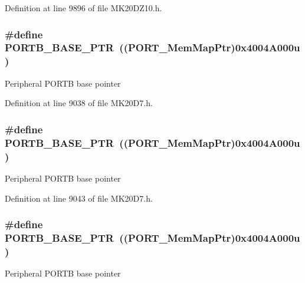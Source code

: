 Definition at line 9896 of file M\+K20\+D\+Z10.\+h.

\subsubsection[{\texorpdfstring{P\+O\+R\+T\+B\+\_\+\+B\+A\+S\+E\+\_\+\+P\+TR}{PORTB_BASE_PTR}}]{\setlength{\rightskip}{0pt plus 5cm}\#define P\+O\+R\+T\+B\+\_\+\+B\+A\+S\+E\+\_\+\+P\+TR~(({\bf P\+O\+R\+T\+\_\+\+Mem\+Map\+Ptr})0x4004\+A000u)}\hypertarget{group___p_o_r_t___peripheral_ga585b4782d1ceb44492289af0019480f9}{}\label{group___p_o_r_t___peripheral_ga585b4782d1ceb44492289af0019480f9}
Peripheral P\+O\+R\+TB base pointer 

Definition at line 9038 of file M\+K20\+D7.\+h.

\subsubsection[{\texorpdfstring{P\+O\+R\+T\+B\+\_\+\+B\+A\+S\+E\+\_\+\+P\+TR}{PORTB_BASE_PTR}}]{\setlength{\rightskip}{0pt plus 5cm}\#define P\+O\+R\+T\+B\+\_\+\+B\+A\+S\+E\+\_\+\+P\+TR~(({\bf P\+O\+R\+T\+\_\+\+Mem\+Map\+Ptr})0x4004\+A000u)}\hypertarget{group___p_o_r_t___peripheral_ga585b4782d1ceb44492289af0019480f9}{}\label{group___p_o_r_t___peripheral_ga585b4782d1ceb44492289af0019480f9}
Peripheral P\+O\+R\+TB base pointer 

Definition at line 9043 of file M\+K20\+D7.\+h.

\subsubsection[{\texorpdfstring{P\+O\+R\+T\+B\+\_\+\+B\+A\+S\+E\+\_\+\+P\+TR}{PORTB_BASE_PTR}}]{\setlength{\rightskip}{0pt plus 5cm}\#define P\+O\+R\+T\+B\+\_\+\+B\+A\+S\+E\+\_\+\+P\+TR~(({\bf P\+O\+R\+T\+\_\+\+Mem\+Map\+Ptr})0x4004\+A000u)}\hypertarget{group___p_o_r_t___peripheral_ga585b4782d1ceb44492289af0019480f9}{}\label{group___p_o_r_t___peripheral_ga585b4782d1ceb44492289af0019480f9}
Peripheral P\+O\+R\+TB base pointer 

